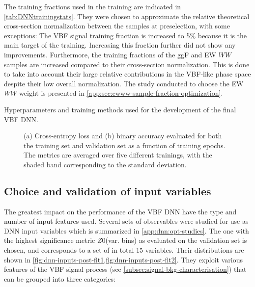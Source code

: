 The training fractions used in the training are indicated in \cref{tab:DNNtrainingstats}. They were chosen to approximate the relative theoretical cross-section normalization between the samples at preselection, with some exceptions: The VBF signal training fraction is increased to 5\% because it is the main target of the training. Increasing this fraction further did not show any improvements. Furthermore, the training fractions of the ggF and EW $WW$ samples are increased compared to their cross-section normalization. This is done to take into account their large relative contributions in the VBF-like phase space despite their low overall normalization. The study conducted to choose the EW $WW$ weight is presented in \cref{app:sec:ewww-sample-fraction-optimization}.

\begin{table}[th]
    \begin{center}
        
    \end{center}
    \caption{Hyperparameters and training methods used for the development of the final VBF DNN.
    }
    \label{tab:DNN-info}
\end{table}

\begin{figure}[t]
    \caption{(a) Cross-entropy loss and (b) binary accuracy evaluated for both the training set and validation set as a function of training epochs. The metrics are averaged over five different trainings, with the shaded band corresponding to the standard deviation.}
    \label{fig:monitoring}
\end{figure}


\subsection{Choice and validation of input variables}
\label{subsec:input-variables-opt}
The greatest impact on the performance of the VBF DNN have the type and number of input features used.
Several sets of observables were studied for use as DNN input variables which is summarized in \cref{app:dnn:opt-studies}.
The one with the highest significance metric $Z0$(var. bins) as evaluated on the validation set is chosen, and corresponds to a set of in total 15 variables.
Their distributions are shown in \cref{fig:dnn-inputs-post-fit1,fig:dnn-inputs-post-fit2}.
They exploit various features of the VBF signal process (see \cref{subsec:signal-bkg-characterisation}) that can be grouped into three categories:

